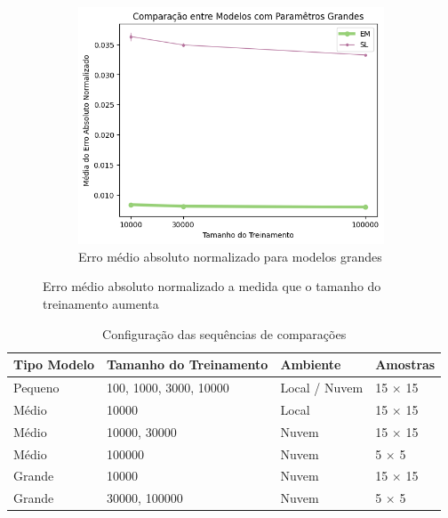 \documentclass{subfiles}
\begin{document}
\begin{figure}
    \hfill
    \begin{subfigure}[b]{0.3\linewidth}
        \centering
        \includegraphics[width=\linewidth]{Figures/resultados/large_abs_norm_prob_error}
        \caption{Erro médio absoluto normalizado para modelos grandes}
    \end{subfigure}
       \caption{Erro médio absoluto normalizado a medida que o tamanho do treinamento aumenta }
       \label{fig:abs_norm_prob}
\end{figure}

\begin{table} 
    \caption{Configuração das sequências de comparações}
    \centering
    \begin{tabular}{l l l l}
        \toprule
        Tipo Modelo & Tamanho do Treinamento & Ambiente & Amostras \\
        \midrule
        Pequeno & 100, 1000, 3000, 10000 & Local / Nuvem & 15 $\times$ 15 \\
        Médio & 10000 & Local & 15 $\times$ 15 \\
        Médio & 10000, 30000 & Nuvem & 15 $\times$ 15 \\
        Médio & 100000 & Nuvem & 5 $\times$ 5 \\
        Grande & 10000 & Nuvem & 15 $\times$ 15 \\
        Grande & 30000, 100000 & Nuvem & 5 $\times$ 5 \\
        \bottomrule
    \end{tabular}
    \label{tab:config}
\end{table}
\end{document}
